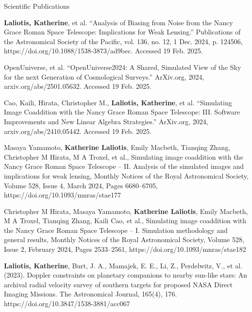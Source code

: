 \documentclass{resume} %
\begin{document}
\begin{rSection}{Scientific Publications}

\item \textbf{Laliotis, Katherine}, et al. “Analysis of Biasing from Noise from the Nancy Grace Roman Space Telescope: Implications for Weak Lensing.” Publications of the Astronomical Society of the Pacific, vol. 136, no. 12, 1 Dec. 2024, p. 124506, https://doi.org/10.1088/1538-3873/ad9bec. Accessed 19 Feb. 2025.

\item OpenUniverse, et al. “OpenUniverse2024: A Shared, Simulated View of the Sky for the next Generation of Cosmological Surveys.” ArXiv.org, 2024, arxiv.org/abs/2501.05632. Accessed 19 Feb. 2025.

\item Cao, Kaili, Hirata, Christopher M., \textbf{Laliotis, Katherine}, et al. “Simulating Image Coaddition with the Nancy Grace Roman Space Telescope: III. Software Improvements and New Linear Algebra Strategies.” ArXiv.org, 2024, arxiv.org/abs/2410.05442. Accessed 19 Feb. 2025.

\item Masaya Yamamoto, \textbf{Katherine Laliotis}, Emily Macbeth, Tianqing Zhang, Christopher M Hirata, M A Troxel, et al., Simulating image coaddition with the Nancy Grace Roman Space Telescope – II. Analysis of the simulated images and implications for weak lensing, Monthly Notices of the Royal Astronomical Society, Volume 528, Issue 4, March 2024, Pages 6680–6705, https://doi.org/10.1093/mnras/stae177

\item Christopher M Hirata, Masaya Yamamoto, \textbf{Katherine Laliotis}, Emily Macbeth, M A Troxel, Tianqing Zhang, Kaili Cao, et al., Simulating image coaddition with the Nancy Grace Roman Space Telescope – I. Simulation methodology and general results, Monthly Notices of the Royal Astronomical Society, Volume 528, Issue 2, February 2024, Pages 2533–2561, https://doi.org/10.1093/mnras/stae182

\item \textbf{Laliotis, Katherine}, Burt, J. A., Mamajek, E. E., Li, Z., Perdelwitz, V., et al. (2023). Doppler constraints on planetary companions to nearby sun-like stars: An archival radial velocity survey of southern targets for proposed NASA Direct Imaging Missions. The Astronomical Journal, 165(4), 176. https://doi.org/10.3847/1538-3881/acc067 

\end{rSection}
\end{document}
